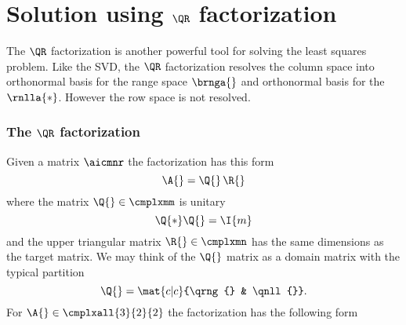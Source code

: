 \section{Solution using $\QR$ factorization}
The $\QR$ factorization is another powerful tool for solving the least squares problem. Like the SVD, the $\QR$ factorization resolves the column space into orthonormal basis for the range space $\brnga{}$ and orthonormal basis for the \ns \ $\rnlla{*}$. However the row space is not resolved. 


\subsubsection{The $\QR$ factorization}
Given a matrix $\aicmnr$ the factorization has this form
\begin{equation}
  \A{} = \Q{}\, \R{}
\end{equation}
where the matrix $\Q{}\in\cmplxmm$ is unitary
\begin{equation}
  \Q{*}\Q{} = \I{m}
\end{equation}
and the upper triangular matrix $\R{}\in\cmplxmn$ has the same dimensions as the target matrix. We may think of the $\Q{}$ matrix as a domain matrix with the typical partition
\begin{equation}
  \Q{} = \mat{c|c}{\qrng{} & \qnll{}}.
\end{equation}
For $\A{}\in\cmplxall{3}{2}{2}$ the factorization has the following form



